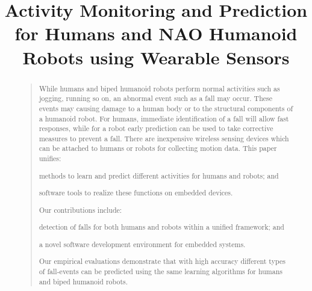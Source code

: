 \documentclass[letterpaper]{article}
\begin{document}
 \begin{sloppy}
%
\title{Activity Monitoring and Prediction for Humans and NAO Humanoid Robots using 
Wearable Sensors}
\maketitle
\begin{abstract}
\begin{quote}
While humans and biped humanoid robots perform normal activities such as jogging, running so on, an 
abnormal event such as a fall may occur. These events may causing damage to a human body or to 
the structural components of a humanoid robot. For humans, immediate identification of a fall will 
allow fast responses, while for a robot early prediction can be used to take corrective measures to 
prevent a fall. There are inexpensive wireless sensing devices which can be  attached to humans or 
robots for collecting motion data. This paper unifies: \begin{inparaenum}[1)] \item 
methods to learn and predict different activities for humans and robots; and \item software 
tools to realize these functions  on embedded devices. \end{inparaenum} Our contributions include: 
\begin{inparaenum}[1)] \item detection of falls for both humans and robots within a unified 
framework; and \item  a  novel software development environment for embedded systems. 
\end{inparaenum} Our empirical evaluations demonstrate that with high accuracy different types of  
fall-events can be predicted using the same learning algorithms for humans and biped humanoid 
robots. 
\end{quote}
\end{abstract}


\end{sloppy}
\end{document}
